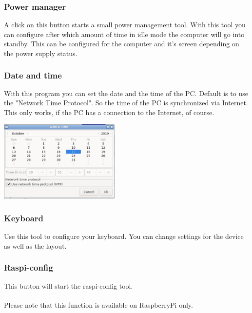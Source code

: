 \documentclass[a4paper,12pt,twoside]{article}
\begin{document}
\subsubsection{Power manager}
\label{sct:power_management}
A click on this button starts a small power management tool. With this tool
you can configure after which amount of time in idle mode the computer will 
go into standby. This can be configured for the computer and it's screen 
depending on the power supply status.


\subsubsection{Date and time}
\label{sct:date_time}
With this program you can set the date and the time of the PC. Default
is to use the "Network Time Protocol". So
the time of the PC is synchronized via Internet. This only works, if
the PC has a connection to the Internet, of course.

\bigskip
\begin{minipage}{\linewidth}
  \centering
  \captionsetup{type=figure}
  \includegraphics[width=6cm]{screenshots/efalive_setup_date_dialog.png}
  \label{fig:date_time}
\end{minipage}
\bigskip

\subsubsection{Keyboard}
\label{sct:efalivesetup_keyboard}
Use this tool to configure your keyboard. You can change settings for
the device as well as the layout.


\subsubsection{Raspi-config}
\label{sct:efalivesetup_raspi_config}
This button will start the raspi-config tool.\\
\\
Please note that this function is available on RaspberryPi only.
\end{document}
